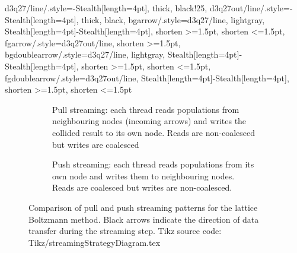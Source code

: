 \tikzset
{
  d3q27/line/.style={-{Stealth[length=4pt]}, thick, black!25},
  d3q27out/line/.style={-{Stealth[length=4pt]}, thick, black},
  bgarrow/.style={d3q27/line, lightgray, {Stealth[length=4pt]}-{Stealth[length=4pt]}, shorten >=1.5pt, shorten <=1.5pt},
  fgarrow/.style={d3q27out/line, shorten >=1.5pt},
  bgdoublearrow/.style={d3q27/line, lightgray, {Stealth[length=4pt]}-{Stealth[length=4pt]}, shorten >=1.5pt, shorten <=1.5pt},
  fgdoublearrow/.style={d3q27out/line, {Stealth[length=4pt]}-{Stealth[length=4pt]}, shorten >=1.5pt, shorten <=1.5pt}
}
\begin{figure}[hbt!]
    \centering
    \begin{subfigure}[b]{0.49\textwidth}
        \centering
        \begin{minipage}{0.49\linewidth}
            \centering
            
        \end{minipage}
        \hfill
        \begin{minipage}{0.48\linewidth}
            \centering
            
        \end{minipage}
        \caption{Pull streaming: each thread reads populations from neighbouring nodes (incoming arrows) and writes the collided result to its own node. Reads are non-coalesced but writes are coalesced}
        \label{fig:pull_streaming}
    \end{subfigure}
    \hfill
    \begin{subfigure}[b]{0.49\textwidth}
        \centering
        \begin{minipage}{0.49\linewidth}
            \centering
            
        \end{minipage}
        \hfill
        \begin{minipage}{0.48\linewidth}
            \centering
            
        \end{minipage}
        \caption{Push streaming: each thread reads populations from its own node and writes them to neighbouring nodes. Reads are coalesced but writes are non-coalesced.}
        \label{fig:push_streaming}
    \end{subfigure}
    \caption{Comparison of pull and push streaming patterns for the lattice Boltzmann method. Black arrows indicate the direction of data transfer during the streaming step. Tikz source code: Tikz/streamingStrategyDiagram.tex}
    \label{fig:StreamingStrategies}
\end{figure}